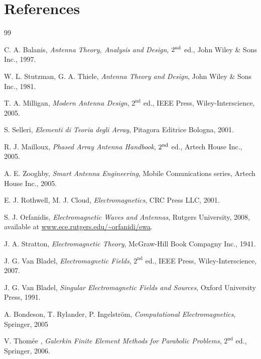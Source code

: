 \cleardoublepage
{}
\thispagestyle{myheadings}
\renewcommand\thefigure{\arabic{figure}}
\pagestyle{myheadings}
\chapter*{References}
\begin{thebibliography}{99}

 C. A. Balanis, \emph{Antenna Theory, Analysis and Design}, $2^{\mathrm{nd}}$ ed., John Wiley \& Sons Inc., 1997.

 W. L. Stutzman, G. A. Thiele, \emph{Antenna Theory and Design}, John Wiley \& Sons Inc., 1981.

 T. A. Milligan, \emph{Modern Antenna Design}, $2^\mathrm{nd}$ ed., IEEE Press, Wiley-Interscience, 2005.

 S. Selleri, \emph{Elementi di Teoria degli Array}, Pitagora Editrice Bologna, 2001.

 R. J. Mailloux, \emph{Phased Array Antenna Handbook}, $2^{\mathrm{nd}}$ ed.,  Artech House Inc., 2005.

 A. E. Zooghby, \emph{Smart Antenna Engineering}, Mobile Comunications series,  Artech House Inc., 2005.

 E. J. Rothwell, M. J. Cloud, \emph{Electromagnetics}, CRC Press LLC, 2001.

 S. J. Orfanidis, \emph{Electromagnetic Waves and Antennas}, Rutgers University, 2008, available at \url{www.ece.rutgers.edu/~orfanidi/ewa}.

 J. A. Stratton, \emph{Electromagnetic Theory}, McGraw-Hill Book Compagny Inc., 1941.

 J. G. Van Bladel, \emph{Electromagnetic Fields}, $2^\mathrm{nd}$ ed., IEEE Press, Wiley-Interscience, 2007.

 J. G. Van Bladel, \emph{Singular Electromagnetic Fields and Sources}, Oxford University Press, 1991.

 A. Bondeson, T. Rylander, P. Ingelstr\"{o}m, \emph{Computational Electromagnetics}, Springer, 2005

 V. Thom\'{e}e , \emph{Galerkin Finite Element Methods for Parabolic Problems}, $2^\mathrm{nd}$ ed., Springer, 2006.


\end{thebibliography}
